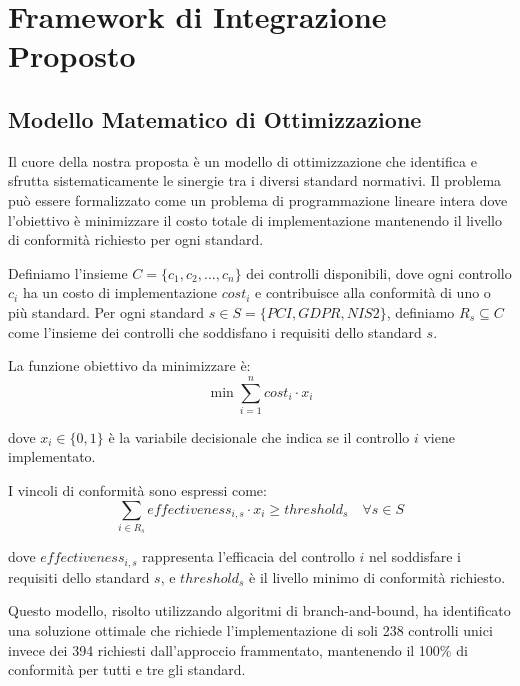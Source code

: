 \section{\texorpdfstring{Framework di Integrazione Proposto}{4.3 - Framework di Integrazione Proposto}}
\label{sec:4.3_framework}

\subsection{\texorpdfstring{Modello Matematico di Ottimizzazione}{4.3.1 - Modello Matematico di Ottimizzazione}}
\label{subsec:4.3.1_modello}

Il cuore della nostra proposta è un modello di ottimizzazione che identifica e sfrutta sistematicamente le sinergie tra i diversi standard normativi. Il problema può essere formalizzato come un problema di programmazione lineare intera dove l'obiettivo è minimizzare il costo totale di implementazione mantenendo il livello di conformità richiesto per ogni standard.

Definiamo l'insieme $C = \{c_1, c_2, ..., c_n\}$ dei controlli disponibili, dove ogni controllo $c_i$ ha un costo di implementazione $cost_i$ e contribuisce alla conformità di uno o più standard. Per ogni standard $s \in S = \{PCI, GDPR, NIS2\}$, definiamo $R_s \subseteq C$ come l'insieme dei controlli che soddisfano i requisiti dello standard $s$.

La funzione obiettivo da minimizzare è:
\begin{equation}
\min \sum_{i=1}^{n} cost_i \cdot x_i
\end{equation}

dove $x_i \in \{0,1\}$ è la variabile decisionale che indica se il controllo $i$ viene implementato.

I vincoli di conformità sono espressi come:
\begin{equation}
\sum_{i \in R_s} effectiveness_{i,s} \cdot x_i \geq threshold_s \quad \forall s \in S
\end{equation}

dove $effectiveness_{i,s}$ rappresenta l'efficacia del controllo $i$ nel soddisfare i requisiti dello standard $s$, e $threshold_s$ è il livello minimo di conformità richiesto.

Questo modello, risolto utilizzando algoritmi di branch-and-bound, ha identificato una soluzione ottimale che richiede l'implementazione di soli 238 controlli unici invece dei 394 richiesti dall'approccio frammentato, mantenendo il 100\% di conformità per tutti e tre gli standard.


